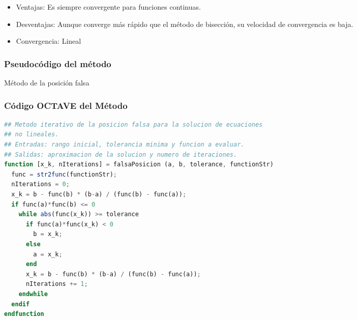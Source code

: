 \documentclass[12pt]{article}
\begin{document}
\begin{itemize}
    \item Ventajas: Es siempre convergente para funciones continuas.
    \item Desventajas: Aunque converge más rápido que el método de bisección, su velocidad de convergencia es baja.
    \item Convergencia: Lineal
\end{itemize}

\subsubsection{Pseudocódigo del método}
\begin{algorithm}[H]
\caption{Método de la posición falsa}
    \SetAlgoLined

\end{algorithm}

\subsubsection{Código OCTAVE del Método}

\begin{lstlisting}[language=OCTAVE, caption=Implementación del método de la posición falsa en Octave]
## Metodo iterativo de la posicion falsa para la solucion de ecuaciones
## no lineales.
## Entradas: rango inicial, tolerancia minima y funcion a evaluar.
## Salidas: aproximacion de la solucion y numero de iteraciones.
function [x_k, nIterations] = falsaPosicion (a, b, tolerance, functionStr)
  func = str2func(functionStr);
  nIterations = 0;
  x_k = b - func(b) * (b-a) / (func(b) - func(a));
  if func(a)*func(b) <= 0
    while abs(func(x_k)) >= tolerance
      if func(a)*func(x_k) < 0
        b = x_k;
      else
        a = x_k;
      end
      x_k = b - func(b) * (b-a) / (func(b) - func(a));
      nIterations += 1;
    endwhile
  endif
endfunction

\end{lstlisting}
\end{document}
